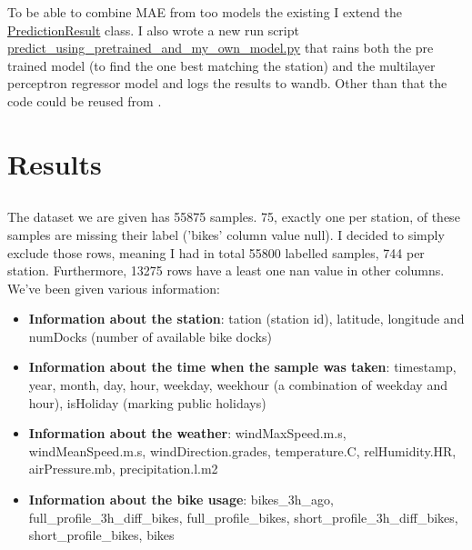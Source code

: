 \documentclass[a4paper]{article}
\begin{document}
    To be able to combine MAE from too models the existing I extend the \href{https://github.com/isabelladegen/mlp-2021/blob/fba40c1f27f066e1c5413c45a50c90a32a018f81/src/PredictionResult.py}{PredictionResult}
    class. I also wrote a new run script \href{https://github.com/isabelladegen/mlp-2021/blob/fba40c1f27f066e1c5413c45a50c90a32a018f81/src/predict_using_pretrained_and_my_own_model.py}{predict\_using\_pretrained\_and\_my\_own\_model.py}
    that rains both the pre trained model (to find the one best matching the station) and the multilayer perceptron regressor model
    and logs the results to wandb. Other than that the code could be reused from .




    \section{Results}\label{sec:results}
    \subsection*{}
    \subsubsection*{}
    The dataset we are given has 55875 samples. 75, exactly one per station, of these samples are missing their label ('bikes'
    column value null).
    I decided to simply exclude those rows, meaning I had in total 55800 labelled samples, 744 per station. Furthermore,
    13275 rows have a least one nan value in other columns.
    We've been given various information:
    \begin{itemize}
        \item \textbf{Information about the station}: tation (station id), latitude, longitude and
        numDocks (number of available bike docks)
        \item \textbf{Information about the time when the sample was taken}: timestamp, year, month, day, hour,
        weekday, weekhour (a combination of weekday and hour), isHoliday (marking public holidays)
        \item \textbf{Information about the weather}: windMaxSpeed.m.s, windMeanSpeed.m.s,  windDirection.grades,
        temperature.C, relHumidity.HR, airPressure.mb, precipitation.l.m2
        \item \textbf{Information about the bike usage}: bikes\_3h\_ago, full\_profile\_3h\_diff\_bikes,
        full\_profile\_bikes, short\_profile\_3h\_diff\_bikes, short\_profile\_bikes, bikes
    \end{itemize}
\end{document}

